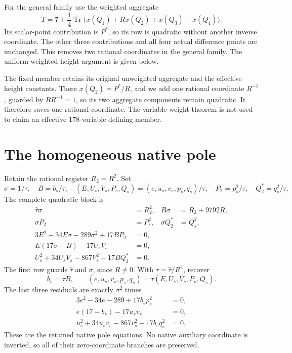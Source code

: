 \documentclass[11pt]{article}
\theoremstyle{remark}\newtheorem{remark}[theorem]{Remark}
\newcommand{\Tr}{\operatorname{Tr}}\newcommand{\Nm}{\operatorname{Nm}}
\begin{document}
For the general family use the weighted aggregate
\begin{equation}\label{eq:weightedaggregate}
 T=7+\frac14\Tr\bigl(x(Q_1)+R x(Q_2)+x(Q_3)+x(Q_4)\bigr).
\end{equation}
Its scalar-point contribution is $P^*$, so its row is quadratic
without another inverse coordinate. The other three contributions
and all four actual difference points are unchanged. This removes
two rational coordinates in the general family. The uniform weighted
height argument is given below.

The fixed member retains its original unweighted aggregate and the
effective height constants. There $x(Q_2)=P^*/R$, and we add one
rational coordinate $R^{-1}$, guarded by $R R^{-1}=1$, so its two
aggregate components remain quadratic. It therefore saves one
rational coordinate. The variable-weight theorem is not used to
claim an effective 178-variable defining member.

\section{The homogeneous native pole}
Retain the rational register $R_2=R^2$. Set
\[
 \sigma=1/\tau,\quad B=b_s/\tau,\quad
 (E,U_s,V_s,P_s,Q_s)=(e,u_s,v_s,p_s,q_s)/\tau,
 \quad P_2=p_s^2/\tau,\quad Q_2^*=q_s^2/\tau.
\]
The complete quadratic block is
\begin{equation}\label{eq:native}
\begin{aligned}
 \widehat\tau\sigma&=R_2^2,&B\sigma&=R_2+9792R,\\
 \sigma P_2&=P_s^2,&\sigma Q_2^*&=Q_s^2,\\
 3E^2-34E\sigma-289\sigma^2+17BP_2&=0,\\
 E(17\sigma-B)-17U_sV_s&=0,\\
 U_s^2+34U_sV_s-867V_s^2-17BQ_2^*&=0.
\end{aligned}
\end{equation}
The first row guards $\widehat\tau$ and $\sigma$, since $R\ne0$.
With $\tau=\widehat\tau/R^4$, recover
\[
 b_s=\tau B,\qquad
 (e,u_s,v_s,p_s,q_s)=\tau(E,U_s,V_s,P_s,Q_s).
\]
The last three residuals are exactly $\sigma^2$ times
\[
\begin{aligned}
 3e^2-34e-289+17b_sp_s^2&=0,\\
 e(17-b_s)-17u_sv_s&=0,\\
 u_s^2+34u_sv_s-867v_s^2-17b_sq_s^2&=0.
\end{aligned}
\]
These are the retained native pole equations. No native auxiliary
coordinate is inverted, so all of their zero-coordinate branches
are preserved.
\end{document}
